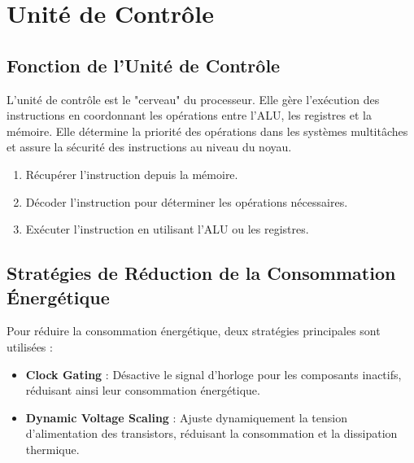 \documentclass[10pt,a4paper]{article}
\begin{document}

\section*{Unité de Contrôle}

\subsection*{Fonction de l'Unité de Contrôle}

L'unité de contrôle est le "cerveau" du processeur. Elle gère l'exécution des instructions en coordonnant les opérations entre l'ALU, les registres et la mémoire. Elle détermine la priorité des opérations dans les systèmes multitâches et assure la sécurité des instructions au niveau du noyau.

\begin{enumerate}
    \item Récupérer l'instruction depuis la mémoire.
    \item Décoder l'instruction pour déterminer les opérations nécessaires.
    \item Exécuter l'instruction en utilisant l'ALU ou les registres.
\end{enumerate}


\subsection*{Stratégies de Réduction de la Consommation Énergétique}

Pour réduire la consommation énergétique, deux stratégies principales sont utilisées :
\begin{itemize}
    \item \textbf{Clock Gating} : Désactive le signal d'horloge pour les composants inactifs, réduisant ainsi leur consommation énergétique.
    \item \textbf{Dynamic Voltage Scaling} : Ajuste dynamiquement la tension d'alimentation des transistors, réduisant la consommation et la dissipation thermique.
\end{itemize}
\end{document}
